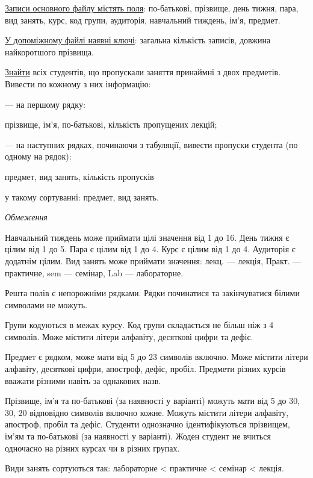 \documentclass[11pt, ukrainian]{article}
\begin{document}
\underline{Записи основного файлу містять поля}: по-батькові, прізвище, день тижня, пара, вид занять, курс, код групи, аудиторія, навчальний тиждень, ім’я, предмет.

\underline{У допоміжному файлі наявні ключі}: загальна кількість записів, довжина найкоротшого прізвища.

\underline{Знайти} всіх студентів, що пропускали заняття принаймні з двох предметів. Вивести по кожному з них інформацію:\par
{\noindent}--- на першому рядку:\par
прізвище, ім’я, по-батькові, кількість пропущених лекцій;

{\noindent}--- на наступних рядках, починаючи з табуляції, вивести пропуски студента (по одному на рядок):\par
предмет, вид занять, кількість пропусків

{\noindent}у такому сортуванні: предмет, вид занять.


\bigskip\textit{Обмеження}

Навчальний тиждень може приймати цілі значення від 1 до 16.
День тижня є цілим від 1 до 5. Пара є цілим від 1 до 4.
Курс є цілим від 1 до 4. Аудиторія є додатнім цілим.
Вид занять може приймати значення:
лекц. --- лекція, Практ. --- практичне, sem --- семінар, Lab --- лабораторне.

Решта полів є непорожніми рядками.
Рядки починатися та закінчуватися білими символами не можуть.

Групи кодуються в межах курсу.
Код групи складається не більш ніж з 4 символів.
Може містити літери алфавіту, десяткові цифри та дефіс.

Предмет є рядком, може мати від 5 до 23 символів включно.
Може містити літери алфавіту, десяткові цифри, апостроф, дефіс, пробіл.
Предмети різних курсів вважати різними навіть за однакових назв.

Прізвище, ім’я та по-батькові (за наявності у варіанті)
можуть мати від 5 до 30, 30, 20 відповідно символів включно кожне.
Можуть містити літери алфавіту, апостроф, пробіл та дефіс.
Студенти однозначно ідентифікуються прізвищем, ім’ям та по-батькові (за наявності у варіанті).
Жоден студент не вчиться одночасно на різних курсах чи в різних групах.

Види занять сортуються так: лабораторне < практичне < семінар < лекція.
\end{document}
